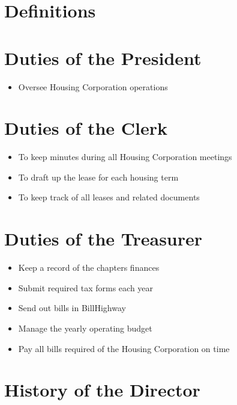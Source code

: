 \chapter{Definitions}

\chapter{Duties of the President}
\label{app:duties-of-executive-chairmen}

\begin{itemize}
        \item Oversee Housing Corporation operations
\end{itemize}

\chapter{Duties of the Clerk}
\label{app:duties-of-other-officers}

\begin{itemize}
        \item To keep minutes during all Housing Corporation meetings
        \item To draft up the lease for each housing term
        \item To keep track of all leases and related documents
\end{itemize}

\chapter{Duties of the Treasurer}
\label{app:duties-of-kai-cabinet}

\begin{itemize}
        \item Keep a record of the chapters finances
        \item Submit required tax forms each year
        \item Send out bills in BillHighway
        \item Manage the yearly operating budget
        \item Pay all bills required of the Housing Corporation on time
\end{itemize}

\chapter{History of the Director}
\label{app:duties-director}

